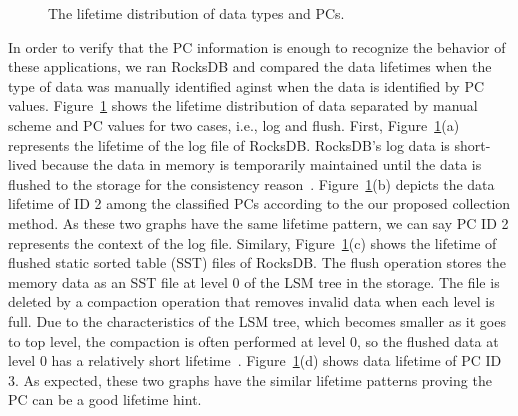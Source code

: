 \begin{figure}[!t]
\centering
\hspace{1pt}
\hfill
\vspace{-10pt}
\caption{The lifetime distribution of data types and PCs.} \label{fig:types_and_PCs}
\vspace{-20pt}
\end{figure}

In order to verify that the PC information is enough to recognize the behavior of these applications, 
we ran RocksDB and compared the data lifetimes when the type of data was manually identified 
aginst when the data is identified by PC values.
Figure~\ref{fig:types_and_PCs} shows the lifetime distribution of data separated by manual scheme and 
PC values for two cases, i.e., log and flush.
First, Figure~\ref{fig:types_and_PCs}(a) represents the lifetime of the log file of RocksDB. 
RocksDB's log data is short-lived because the data in memory is temporarily maintained
until the data is flushed to the storage for the consistency reason~\cite{RocksDB}.
Figure~\ref{fig:types_and_PCs}(b) depicts the data lifetime of ID 2 among the classified PCs 
according to the our proposed collection method.
As these two graphs have the same lifetime pattern, we can say PC ID 2 represents the context of the log file.
Similary, Figure~\ref{fig:types_and_PCs}(c) shows the lifetime of flushed static sorted table (SST)
files of RocksDB.
The flush operation stores the memory data as an SST file at level 0 of the LSM tree in the storage.
The file is deleted by a compaction operation that removes invalid data when each level is full.
Due to the characteristics of the LSM tree, which becomes smaller as it goes to top level,
the compaction is often performed at level 0,
so the flushed data at level 0 has a relatively short lifetime~\cite{RocksDB}.
Figure~\ref{fig:types_and_PCs}(d) shows data lifetime of PC ID 3.
As expected, these two graphs have the similar lifetime patterns proving the PC can be a good lifetime hint.


